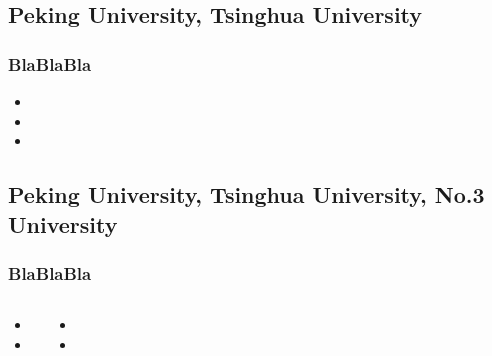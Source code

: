 \documentclass[hyperref={bookmarks=false},aspectratio=169]{beamer}
\begin{document}
		\subsection{Peking University, Tsinghua University}
		
	\begin{frame}
	\frametitle{BlaBlaBla}

\begin{itemize}
	\item 
	\item 
	\item 
\end{itemize}

\end{frame}	

     \subsection{Peking University, Tsinghua University, No.3 University}
\begin{frame}
	\frametitle{BlaBlaBla}

\begin{columns}
	

	\begin{itemize}
		\item 
		\item 
	\end{itemize}
	

	\begin{itemize}
		\item 
		\item 
	\end{itemize}
	
	\end{columns}

\end{frame}
\end{document}
